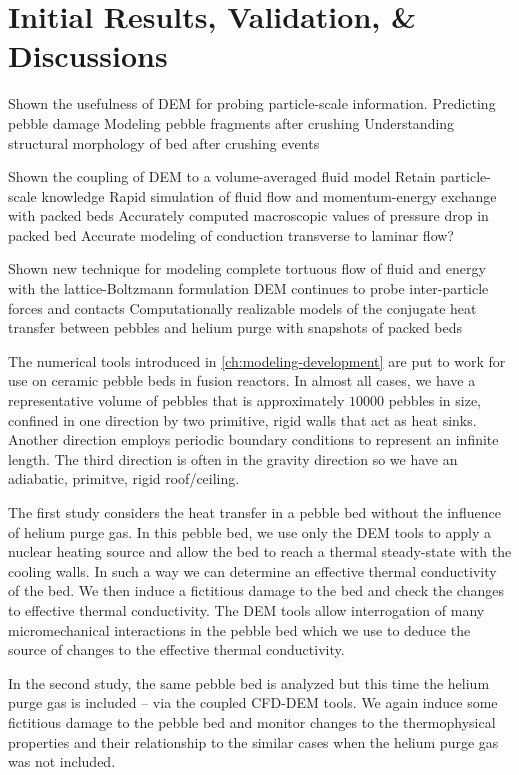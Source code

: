 \chapter{Initial Results, Validation, \& Discussions}\label{sec:dem-studies}

Shown the usefulness of DEM for probing particle-scale information.
Predicting pebble damage
Modeling pebble fragments after crushing
Understanding structural morphology of bed after crushing events

Shown the coupling of DEM to a volume-averaged fluid model
Retain particle-scale knowledge
Rapid simulation of fluid flow and momentum-energy exchange with packed beds
Accurately computed macroscopic values of pressure drop in packed bed
Accurate modeling of conduction transverse to laminar flow?

Shown new technique for modeling complete tortuous flow of fluid and energy with the lattice-Boltzmann formulation
DEM continues to probe inter-particle forces and contacts
Computationally realizable models of the conjugate heat transfer between pebbles and helium purge with snapshots of packed beds

The numerical tools introduced in \cref{ch:modeling-development} are put to work for use on ceramic pebble beds in fusion reactors. In almost all cases, we have a representative volume of pebbles that is approximately $10000$ pebbles in size, confined in one direction by two primitive, rigid walls that act as heat sinks. Another direction employs periodic boundary conditions to represent an infinite length. The third direction is often in the gravity direction so we have an adiabatic, primitve, rigid roof/ceiling.

The first study considers the heat transfer in a pebble bed without the influence of helium purge gas. In this pebble bed, we use only the DEM tools to apply a nuclear heating source and allow the bed to reach a thermal steady-state with the cooling walls. In such a way we can determine an effective thermal conductivity of the bed. We then induce a fictitious damage to the bed and check the changes to effective thermal conductivity. The DEM tools allow interrogation of many micromechanical interactions in the pebble bed which we use to deduce the source of changes to the effective thermal conductivity.

In the second study, the same pebble bed is analyzed but this time the helium purge gas is included -- via the coupled CFD-DEM tools. We again induce some fictitious damage to the pebble bed and monitor changes to the thermophysical properties and their relationship to the similar cases when the helium purge gas was not included.

